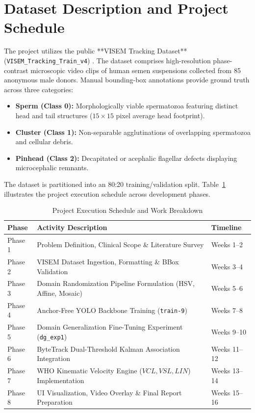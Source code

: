 \documentclass[12pt,a4paper]{report}
\begin{document}
\section{Dataset Description and Project Schedule}
The project utilizes the public **VISEM Tracking Dataset** (\texttt{VISEM\_Tracking\_Train\_v4}) \cite{visemtrack2023}. The dataset comprises high-resolution phase-contrast microscopic video clips of human semen suspensions collected from 85 anonymous male donors. Manual bounding-box annotations provide ground truth across three categories:
\begin{itemize}
    \item \textbf{Sperm (Class 0):} Morphologically viable spermatozoa featuring distinct head and tail structures ($15 \times 15$ pixel average head footprint).
    \item \textbf{Cluster (Class 1):} Non-separable agglutinations of overlapping spermatozoa and cellular debris.
    \item \textbf{Pinhead (Class 2):} Decapitated or acephalic flagellar defects displaying microcephalic remnants.
\end{itemize}
The dataset is partitioned into an 80:20 training/validation split. Table~\ref{tab:dataset_gantt} illustrates the project execution schedule across development phases.

\begin{table}[htbp]
\centering
\caption{Project Execution Schedule and Work Breakdown}
\label{tab:dataset_gantt}
\vspace{0.2cm}
\begin{tabularx}{0.96\textwidth}{l p{7.0cm} l}
\toprule
\textbf{Phase} & \textbf{Activity Description} & \textbf{Timeline} \\
\midrule
Phase 1 & Problem Definition, Clinical Scope \& Literature Survey & Weeks 1--2 \\
Phase 2 & VISEM Dataset Ingestion, Formatting \& BBox Validation & Weeks 3--4 \\
Phase 3 & Domain Randomization Pipeline Formulation (HSV, Affine, Mosaic) & Weeks 5--6 \\
Phase 4 & Anchor-Free YOLO Backbone Training (\texttt{train-9}) & Weeks 7--8 \\
Phase 5 & Domain Generalization Fine-Tuning Experiment (\texttt{dg\_exp1}) & Weeks 9--10 \\
Phase 6 & ByteTrack Dual-Threshold Kalman Association Integration & Weeks 11--12 \\
Phase 7 & WHO Kinematic Velocity Engine ($VCL, VSL, LIN$) Implementation & Weeks 13--14 \\
Phase 8 & UI Visualization, Video Overlay \& Final Report Preparation & Weeks 15--16 \\
\bottomrule
\end{tabularx}
\end{table}
\end{document}
